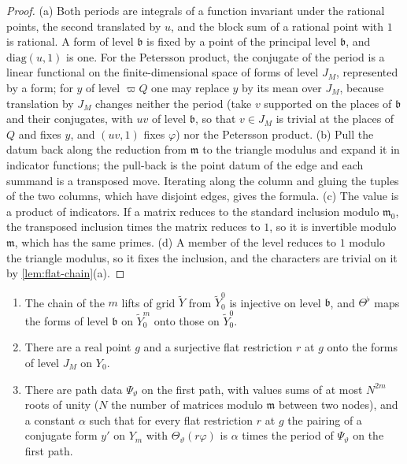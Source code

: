 \begin{proof}
(a) Both periods are integrals of a function invariant under the rational points, the second translated by $u$, and the block sum of a rational point with $1$ is rational. A form of level $\mathfrak b$ is fixed by a point of the
principal level $\mathfrak b$, and $\mathrm{diag}(u,1)$ is one. For the Petersson product, the conjugate of the period is a linear functional on the finite-dimensional space of forms of level $J_M$, represented by a form; for $y$ of
level $\varpi Q$ one may replace $y$ by its mean over $J_M$, because translation by $J_M$ changes neither the period (take $v$ supported on the places of $\mathfrak b$ and their conjugates, with $uv$ of level $\mathfrak b$, so that $v\in J_M$ is
trivial at the places of $Q$ and fixes $y$, and $(uv,1)$ fixes $\varphi$) nor the Petersson product. (b) Pull the datum back along the reduction from $\mathfrak m$ to the triangle modulus and expand it in indicator functions; the
pull-back is the point datum of the edge and each summand is a transposed move. Iterating along the column and gluing the tuples of the two columns, which have disjoint edges, gives the formula. (c) The value is a product of
indicators. If a matrix reduces to the standard inclusion modulo $\mathfrak m_0$, the transposed inclusion times the matrix reduces to $1$, so it is invertible modulo $\mathfrak m$, which has the same primes. (d) A member of the level
reduces to $1$ modulo the triangle modulus, so it fixes the inclusion, and the characters are trivial on it by \cref{lem:flat-chain}(a).
\end{proof}

\begin{proposition}\label{prop:first-path}
\begin{enumerate}[label=\textup{(\alph*)}]
\item The chain of the $m$ lifts of grid $\tilde Y$ from $\tilde Y^0_0$ is injective on level $\mathfrak b$, and $\Theta^\flat$ maps the forms of level $\mathfrak b$ on $\tilde Y^m_0$ onto those on $\tilde Y^0_0$.
\item There are a real point $g$ and a surjective flat restriction $r$ at $g$ onto the forms of level $J_M$ on $Y_0$.
\item There are path data $\Psi_\vartheta$ on the first path, with values sums of at most $N^{2m}$ roots of unity ($N$ the number of matrices modulo $\mathfrak m$ between two nodes), and a constant $\alpha$ such that for every
flat restriction $r$ at $g$ the pairing of a conjugate form $y'$ on $Y_m$ with $\Theta_\vartheta(r\varphi)$ is $\alpha$ times the period of $\Psi_\vartheta$ on the first path.
\end{enumerate}
\end{proposition}

